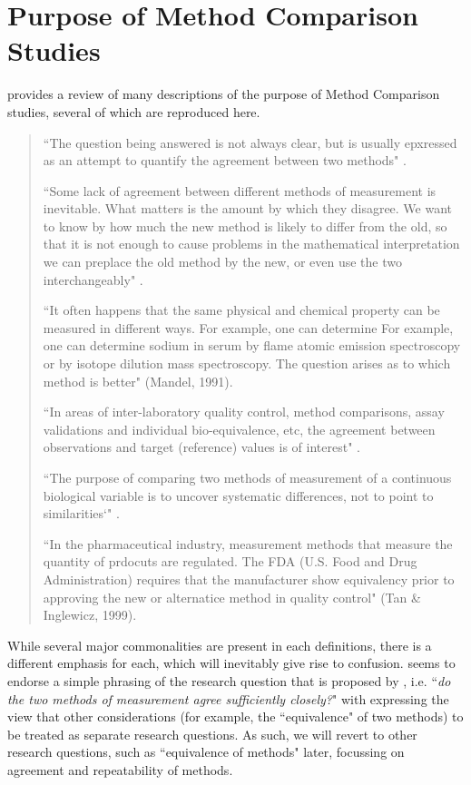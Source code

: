 \documentclass[12pt, a4paper]{report}
\theoremstyle{plain}
\theoremstyle{definition}
\theoremstyle{remark}
\begin{document}
	\section{Purpose of Method Comparison Studies}
	\citet{BXC2010} provides a review of many descriptions of the purpose of Method Comparison studies, several of which are reproduced here.
	
	\begin{quote}
		``The question being answered is not always clear, but is usually epxressed as an attempt to quantify the agreement
		between two methods" \citep{BA95}.
		
		``Some lack of agreement between different methods of measurement is inevitable. What matters is the amount by which they disagree. We want to know by how much the new method is likely to differ from the old, so that it is not enough to cause problems in the mathematical interpretation we can preplace the old method by the new, or even use the two interchangeably" \citep{BA99}.
		
		
		``It often happens that the same physical and chemical property can be measured in different ways. For example, one can determine For example, one can determine sodium in serum by flame atomic emission spectroscopy or by isotope dilution mass spectroscopy. The question arises as to which method is better" (Mandel, 1991).
		
		``In areas of inter-laboratory quality control, method comparisons, assay validations and individual bio-equivalence, etc, the agreement between observations and target (reference) values is
		of interest" \citep{lin2002}.
		
		``The purpose of comparing two methods of measurement of a continuous biological variable is to uncover systematic differences, not to point to
		similarities`" \citep{ludbrook97}.
		
		``In the pharmaceutical industry, measurement methods that measure the quantity of prdocuts are regulated. The FDA (U.S. Food and Drug Administration) requires that the manufacturer show equivalency prior to approving the new or alternatice method in quality control" (Tan \& Inglewicz, 1999). 
	\end{quote}
	
	While several major commonalities are present in each definitions, there is a different emphasis for each, which will inevitably give rise to confusion. \citet{BXC2010} seems to endorse a simple phrasing of the research question that is proposed by \citet{BA83}, i.e. ``\textit{do the two methods of measurement agree sufficiently closely?}" with \citet{BXC2010} expressing the view that other considerations (for example, the ``equivalence" of two methods) to be treated as separate research questions. As such, we will revert to other research questions, such as ``equivalence of methods" later, focussing on agreement and repeatability of methods.
\end{document}
